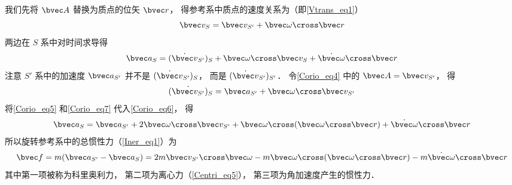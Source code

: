 我们先将 $\bvec A$ 替换为质点的位矢 $\bvec r$， 得参考系中质点的速度关系为（即\autoref{Vtrans_eq1}）
\begin{equation}\label{Corio_eq5}
\bvec v_{S} = \bvec v_{S'} + \bvec\omega\cross\bvec r
\end{equation}
两边在 $S$ 系中对时间求导得
\begin{equation}\label{Corio_eq6}
\bvec a_{S} = (\dot{\bvec v}_{S'})_{S} + \bvec\omega\cross\bvec v_{S} + \dot{\bvec\omega} \cross\bvec r
\end{equation}
注意 $S'$ 系中的加速度 $\bvec a_{S'}$ 并不是 $(\dot{\bvec v}_{S'})_{S}$， 而是 $(\dot{\bvec v}_{S'})_{S'}$． 令\autoref{Corio_eq4} 中的 $\bvec A = \bvec v_{S'}$， 得
\begin{equation}\label{Corio_eq7}
(\dot{\bvec v_{S'}})_{S} = \bvec a_{S'} + \bvec\omega\cross\bvec v_{S'}
\end{equation}
将\autoref{Corio_eq5} 和\autoref{Corio_eq7} 代入\autoref{Corio_eq6}， 得
\begin{equation}
\bvec a_{S} = \bvec a_{S'} + 2\bvec\omega\cross\bvec v_{S'} + \bvec\omega\cross(\bvec\omega\cross\bvec r) + \dot{\bvec\omega} \cross\bvec r
\end{equation}
所以旋转参考系中的总惯性力（\autoref{Iner_eq1}）为
\begin{equation}
\bvec f = m(\bvec a_{S'} - \bvec a_{S}) = 2m\bvec v_{S'}\cross \bvec\omega  -m\bvec\omega\cross(\bvec\omega\cross\bvec r) - m \dot{\bvec\omega} \cross\bvec r
\end{equation}
其中第一项被称为科里奥利力， 第二项为离心力（\autoref{Centri_eq5}）， 第三项为角加速度产生的惯性力．
